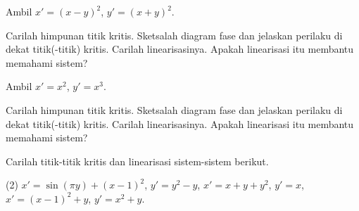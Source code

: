 \begin{exercise}
Ambil $x'=(x-y)^2$, \enspace $y'=(x+y)^2$.
\begin{tasks}
\task Carilah himpunan titik kritis.
\task Sketsalah diagram fase dan jelaskan perilaku di dekat titik(-titik)
kritis.
\task Carilah linearisasinya. Apakah linearisasi itu membantu memahami sistem?
\end{tasks}
\end{exercise}

\begin{exercise}
Ambil $x'=x^2$, \enspace $y'=x^3$.
\begin{tasks}
\task Carilah himpunan titik kritis.
\task Sketsalah diagram fase dan jelaskan perilaku di dekat titik(-titik)
kritis.
\task Carilah linearisasinya. Apakah linearisasi itu membantu memahami sistem?
\end{tasks}
\end{exercise}

\setcounter{exercise}{100}

\pagebreak[2]
\begin{exercise}
Carilah titik-titik kritis dan linearisasi sistem-sistem berikut.
\begin{tasks}(2)
\task $x'=\sin(\pi y)+(x-1)^2$, \enspace $y'=y^2-y$,
\task $x'=x+y+y^2$, \enspace $y'=x$,
\task $x'=(x-1)^2+y$, \enspace $y'=x^2+y$.
\end{tasks}
\end{exercise}

